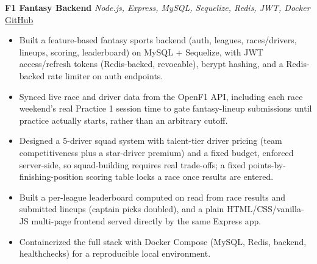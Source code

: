 
\textbf{F1 Fantasy Backend} \hfill \textit{Node.js, Express, MySQL, Sequelize, Redis, JWT, Docker} \hfill \href{https://github.com/abhi8387/f1-fantasy-backend}{GitHub}
\begin{itemize}
    \item Built a feature-based fantasy sports backend (auth, leagues, races/drivers, lineups, scoring, leaderboard) on MySQL + Sequelize, with JWT access/refresh tokens (Redis-backed, revocable), bcrypt hashing, and a Redis-backed rate limiter on auth endpoints.
    \item Synced live race and driver data from the OpenF1 API, including each race weekend's real Practice 1 session time to gate fantasy-lineup submissions until practice actually starts, rather than an arbitrary cutoff.
    \item Designed a 5-driver squad system with talent-tier driver pricing (team competitiveness plus a star-driver premium) and a fixed budget, enforced server-side, so squad-building requires real trade-offs; a fixed points-by-finishing-position scoring table locks a race once results are entered.
    \item Built a per-league leaderboard computed on read from race results and submitted lineups (captain picks doubled), and a plain HTML/CSS/vanilla-JS multi-page frontend served directly by the same Express app.
    \item Containerized the full stack with Docker Compose (MySQL, Redis, backend, healthchecks) for a reproducible local environment.
\end{itemize}
